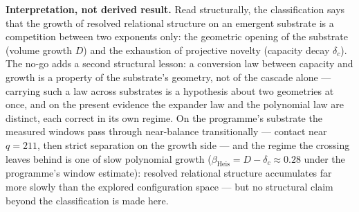 \documentclass[11pt,a4paper]{article}
\theoremstyle{definition}
\newcommand{\dc}{\delta_c}
\begin{document}
\textbf{Interpretation, not derived result.}
Read structurally, the classification says that the growth of resolved relational structure on an emergent
substrate is a competition between two exponents only: the geometric opening of the substrate (volume
growth $D$) and the exhaustion of projective novelty (capacity decay $\dc$).
The no-go adds a second structural lesson: a conversion law between capacity and growth is a property of
the substrate's geometry, not of the cascade alone --- carrying such a law across substrates is a
hypothesis about two geometries at once, and on the present evidence the expander law and the polynomial
law are distinct, each correct in its own regime.
On the programme's substrate the measured windows pass through near-balance transitionally --- contact
near $q = 211$, then strict separation on the growth side --- and the regime the crossing leaves behind is
one of slow polynomial growth ($\beta_{\mathrm{Heis}} = D - \dc \approx 0.28$ under the programme's window
estimate): resolved relational structure accumulates far more slowly than the explored configuration space
--- but no structural claim beyond the classification is made here.



\end{document}
